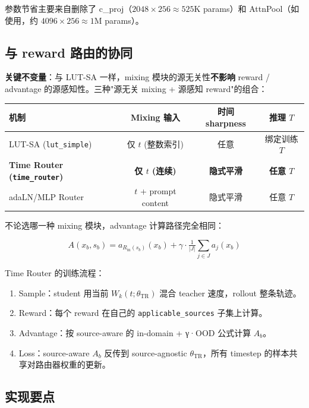 \documentclass[11pt,a4paper]{article}
\begin{document}
参数节省主要来自删除了 c\_proj（$2048 \times 256 \approx 525$K params）和 AttnPool（如使用，约 $4096 \times 256 \approx 1$M params）。

\subsection{与 reward 路由的协同}

\textbf{关键不变量}：与 LUT-SA 一样，mixing 模块的源无关性\textbf{不影响} reward / advantage 的源感知性。三种"源无关 mixing + 源感知 reward"的组合：

\begin{center}
\begin{tabular}{l|c|c|c}
\toprule
\textbf{机制} & \textbf{Mixing 输入} & \textbf{时间 sharpness} & \textbf{推理 $T$} \\
\midrule
LUT-SA (\texttt{lut\_simple}) & 仅 $t$ (整数索引) & 任意 & 绑定训练 $T$ \\
\textbf{Time Router (\texttt{time\_router})} & \textbf{仅 $t$ (连续)} & \textbf{隐式平滑} & \textbf{任意 $T$} \\
adaLN/MLP Router & $t$ + prompt content & 隐式平滑 & 任意 $T$ \\
\bottomrule
\end{tabular}
\end{center}

不论选哪一种 mixing 模块，advantage 计算路径完全相同：

\begin{equation}
A(x_b, s_b) = a_{R_{\text{in}}(s_b)}(x_b) + \gamma \cdot \tfrac{1}{|J|}\textstyle\sum_{j \in J} a_j(x_b)
\end{equation}

Time Router 的训练流程：

\begin{enumerate}
    \item Sample：student 用当前 $W_k(t; \theta_{\text{TR}})$ 混合 teacher 速度，rollout 整条轨迹。
    \item Reward：每个 reward 在自己的 \texttt{applicable\_sources} 子集上计算。
    \item Advantage：按 source-aware 的 in-domain + γ·OOD 公式计算 $A_b$。
    \item Loss：source-aware $A_b$ 反传到 source-agnostic $\theta_{\text{TR}}$，所有 timestep 的样本共享对路由器权重的更新。
\end{enumerate}

\subsection{实现要点}
\end{document}
